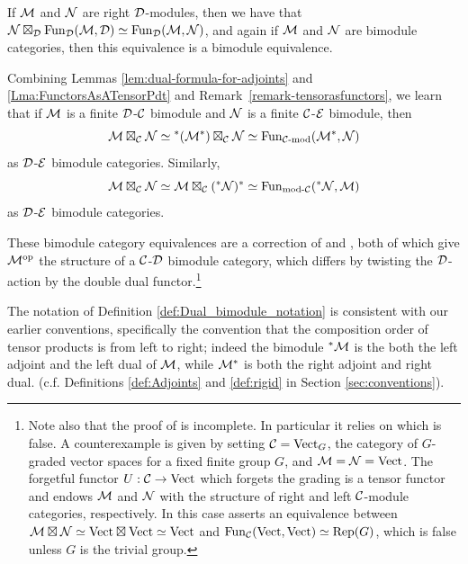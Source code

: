 \documentclass{amsart}
\begin{document}
\begin{remark} \label{remark-tensorasfunctors}
If $\mathcal M$ and $\mathcal N$ are right $\mathcal D$-modules, then we have that $\mathcal N \boxtimes_\mathcal D \operatorname{Fun}_{\mathcal D}(\mathcal M,\mathcal D) \simeq \operatorname{Fun}_{\mathcal D}(\mathcal M,\mathcal N)$, and again if $\mathcal M$ and $\mathcal N$ are bimodule categories, then this equivalence is a bimodule equivalence. 
\end{remark}



\begin{remark} \label{rmk:Deligne_pdt_as_mod_functor}
Combining Lemmas \ref{lem:dual-formula-for-adjoints} and \ref{Lma:FunctorsAsATensorPdt} and Remark~\ref{remark-tensorasfunctors}, we learn that if $\mathcal M$ is a finite $\mathcal D$-$\mathcal C$ bimodule and $\mathcal N$ is a finite $\mathcal C$-$\mathcal E$ bimodule, then 
\begin{equation*}
	\mathcal M \boxtimes_\mathcal C \mathcal N \simeq {}^*(\mathcal M^*) \boxtimes_\mathcal C \mathcal N \simeq \operatorname{Fun}_{\mathcal C\text{-mod}}(\mathcal M^*,\mathcal N)
\end{equation*}
as $\mathcal D$-$\mathcal E$ bimodule categories.   Similarly, 
\begin{equation*}
	\mathcal M \boxtimes_{\mathcal C} \mathcal N \simeq \mathcal M \boxtimes_\mathcal C ({}^*\mathcal N)^* \simeq \operatorname{Fun}_{\text{mod-}\mathcal C}({}^*\mathcal N,\mathcal M)
\end{equation*}
as $\mathcal D$-$\mathcal E$ bimodule categories. 

	 These bimodule category equivalences are a correction of \cite[Remark 3.6]{0909.3140} and \cite[Thm. 3.20]{0911.4979}, both of which give $\mathcal M^{\mathrm{op}}$ the structure of a $\mathcal C$-$\mathcal D$ bimodule category, which differs by twisting the $\mathcal D$-action by the double dual functor.\footnote{Note also that the proof of \cite[Thm. 3.20]{0911.4979} is incomplete. In particular it relies on \cite[Lma. 3.21]{0911.4979} which is false. A counterexample is given by setting $\mathcal C = \mathrm{Vect}_G$, the category of $G$-graded vector spaces for a fixed finite group $G$, and $\mathcal M = \mathcal N = \mathrm{Vect}$. The forgetful functor $U:\mathcal C \to \mathrm{Vect}$ which forgets the grading is a tensor functor and endows $\mathcal M$ and $\mathcal N$ with the structure of right and left $\mathcal C$-module categories, respectively. In this case \cite[Lma. 3.21]{0911.4979} asserts an equivalence between $\mathcal M \boxtimes \mathcal N \simeq \mathrm{Vect} \boxtimes \mathrm{Vect} \simeq \mathrm{Vect}$ and $\operatorname{Fun}_\mathcal C(\mathrm{Vect}, \mathrm{Vect}) \simeq \mathrm{Rep}(G)$, which is false unless $G$ is the trivial group.}

\end{remark}

\begin{remark}
	The notation of Definition \ref{def:Dual_bimodule_notation} is consistent with our earlier conventions, specifically the convention that the composition order of tensor products is from left to right; indeed the bimodule ${}^*\mathcal M$ is the both the left adjoint and the left dual of $\mathcal M$, while $\mathcal M^*$ is both the right adjoint and right dual. (c.f. Definitions \ref{def:Adjoints} and \ref{def:rigid} in Section \ref{sec:conventions}). 
\end{remark}
\end{document}
